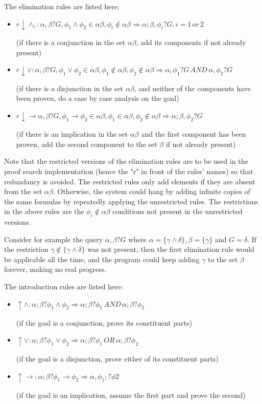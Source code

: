 \documentclass[11pt,twoside,a4paper]{report}
\begin{document}
The elimination rules are listed here:
\begin{itemize}
\item
$r\downarrow\wedge_i:\alpha,\beta?G, \phi_1\wedge\phi_2 \in \alpha\beta, \phi_i \notin \alpha\beta \Rightarrow \alpha;\beta,\phi_i?G, i = 1\, or\, 2$

(if there is a conjunction in the set $\alpha\beta$, add its components if not already present)
\item
$r\downarrow\vee:\alpha,\beta?G, \phi_1\vee\phi_2 \in \alpha\beta, \phi_1 \notin \alpha\beta, \phi_2 \notin \alpha\beta \Rightarrow \alpha,\phi_1?G\, AND\, \alpha,\phi_2?G$

(if there is a disjunction in the set $\alpha\beta$, and neither of the components have been proven, do a case by case analysis on the goal)
\item
$r\downarrow\rightarrow\alpha,\beta?G, \phi_1\rightarrow\phi_2 \in \alpha\beta, \phi_1 \in \alpha\beta, \phi_2 \notin \alpha\beta \Rightarrow \alpha;\beta,\phi_2?G$

(if there is an implication in the set $\alpha\beta$ and the first component has been proven, add the second component to the set $\beta$ if not already present)
\end{itemize}

Note that the restricted versions of the elimination rules are to be used in the proof search implementation (hence the "r" in front of the rules' names) so that redundancy is avoided. The restricted rules only add elements if they are absent from the set $\alpha\beta$. Otherwise, the system could hang by adding infinite copies of the same formulas by repeatedly applying the unrestricted rules. The restrictions in the above rules are the $\phi_i \notin \alpha\beta$ conditions not present in the unrestricted versions.

Consider for example the query $\alpha,\beta?G$ where $\alpha = \{\gamma\wedge\delta\}, \beta = \{\gamma\}$ and $G = \delta$. If the restriction $\gamma \notin \{\gamma\wedge\delta\}$ was not present, then the first elimination rule would be applicable all the time, and the program could keep adding $\gamma$ to the set $\beta$ forever, making no real progress.

The introduction rules are listed here:
\begin{itemize}
\item
$\uparrow\wedge: \alpha;\beta?\phi_1\wedge\phi_2 \Rightarrow \alpha;\beta?\phi_1\, AND\, \alpha;\beta?\phi_2$

(if the goal is a conjunction, prove its constituent parts)
\item
$\uparrow\vee: \alpha;\beta?\phi_1\vee\phi_2 \Rightarrow \alpha;\beta?\phi_1\, OR\, \alpha;\beta?\phi_2$

(if the goal is a disjunction, prove either of its constituent parts)
\item
$\uparrow\rightarrow: \alpha;\beta?\phi_1\rightarrow\phi_2 \Rightarrow \alpha,\phi_1;?\phi2$

(if the goal is an implication, assume the first part and prove the second)
\end{itemize}
\end{document}

